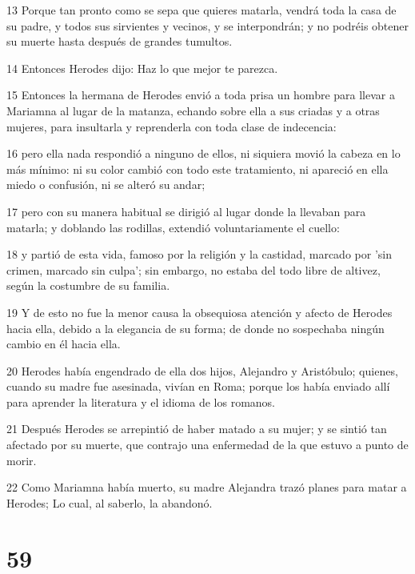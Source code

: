 \par 13 Porque tan pronto como se sepa que quieres matarla, vendrá toda la casa de su padre, y todos sus sirvientes y vecinos, y se interpondrán; y no podréis obtener su muerte hasta después de grandes tumultos.

\par 14 Entonces Herodes dijo: Haz lo que mejor te parezca.

\par 15 Entonces la hermana de Herodes envió a toda prisa un hombre para llevar a Mariamna al lugar de la matanza, echando sobre ella a sus criadas y a otras mujeres, para insultarla y reprenderla con toda clase de indecencia:

\par 16 pero ella nada respondió a ninguno de ellos, ni siquiera movió la cabeza en lo más mínimo: ni su color cambió con todo este tratamiento, ni apareció en ella miedo o confusión, ni se alteró su andar;

\par 17 pero con su manera habitual se dirigió al lugar donde la llevaban para matarla; y doblando las rodillas, extendió voluntariamente el cuello:

\par 18 y partió de esta vida, famoso por la religión y la castidad, marcado por 'sin crimen, marcado sin culpa'; sin embargo, no estaba del todo libre de altivez, según la costumbre de su familia.

\par 19 Y de esto no fue la menor causa la obsequiosa atención y afecto de Herodes hacia ella, debido a la elegancia de su forma; de donde no sospechaba ningún cambio en él hacia ella.

\par 20 Herodes había engendrado de ella dos hijos, Alejandro y Aristóbulo; quienes, cuando su madre fue asesinada, vivían en Roma; porque los había enviado allí para aprender la literatura y el idioma de los romanos.

\par 21 Después Herodes se arrepintió de haber matado a su mujer; y se sintió tan afectado por su muerte, que contrajo una enfermedad de la que estuvo a punto de morir.

\par 22 Como Mariamna había muerto, su madre Alejandra trazó planes para matar a Herodes; Lo cual, al saberlo, la abandonó.

\chapter{59}

